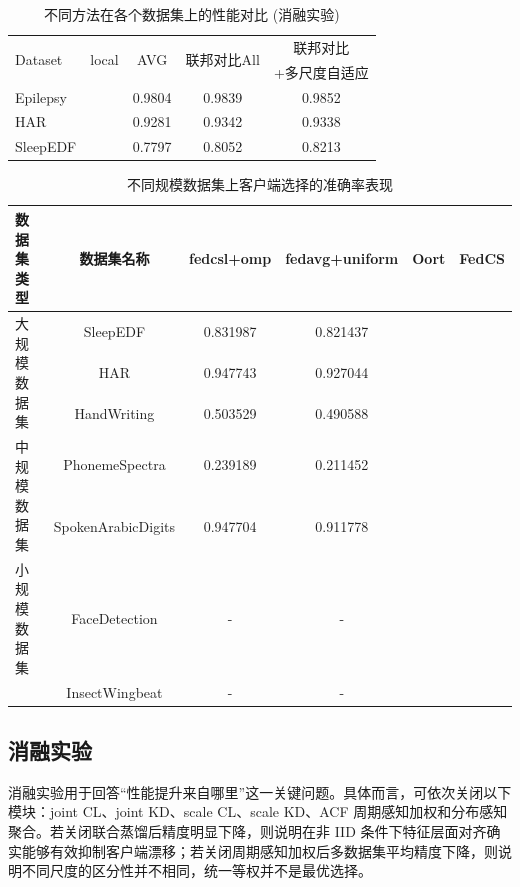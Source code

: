 \documentclass{article}
\begin{document}
\begin{table}[htbp]
    \centering
    \caption{不同方法在各个数据集上的性能对比 (消融实验)}
    \label{tab:performance_comparison_rounded}
    \begin{tabular}{lcccc}
        \toprule
        \multirow{2}{*}{Dataset} & \multirow{2}{*}{local } & \multirow{2}{*}{ AVG} & \multirow{2}{*}{ 联邦对比All} &  联邦对比 \\
        & & & & +多尺度自适应 \\
        \midrule
        Epilepsy & & 0.9804 & 0.9839 & 0.9852 \\
        HAR      & & 0.9281 & 0.9342 & 0.9338 \\
        SleepEDF & & 0.7797 & 0.8052 & 0.8213 \\
        \bottomrule
    \end{tabular}
\end{table}

\begin{table}[htbp]
  \centering
  \caption{不同规模数据集上客户端选择的准确率表现}
  \begin{tabular}{lccccc}
    \toprule
    数据集类型 & 数据集名称 & fedcsl+omp & fedavg+uniform & Oort & FedCS \\
    \midrule
    \multirow{3}{*}{大规模数据集} & SleepEDF & 0.831987 & 0.821437 &  &  \\
    & HAR & 0.947743 & 0.927044 &  &  \\
    & HandWriting & 0.503529 & 0.490588 &  &  \\
    \midrule
    \multirow{2}{*}{中规模数据集} & PhonemeSpectra & 0.239189 & 0.211452 &  &  \\
    & SpokenArabicDigits & 0.947704 & 0.911778 &  &  \\
    \midrule
    小规模数据集 & FaceDetection & - & - &  &  \\
    & InsectWingbeat & - & - &  &  \\
    \bottomrule
  \end{tabular}
  \label{tab:scale_performance}
\end{table}
\subsection{消融实验}

消融实验用于回答“性能提升来自哪里”这一关键问题。具体而言，可依次关闭以下模块：joint CL、joint KD、scale CL、scale KD、ACF 周期感知加权和分布感知聚合。若关闭联合蒸馏后精度明显下降，则说明在非 IID 条件下特征层面对齐确实能够有效抑制客户端漂移；若关闭周期感知加权后多数据集平均精度下降，则说明不同尺度的区分性并不相同，统一等权并不是最优选择。
\end{document}
